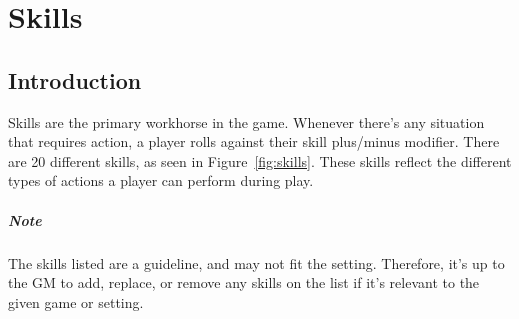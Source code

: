 \chapter{Skills} \label{chap:skills}
\section{Introduction}
Skills are the primary workhorse in the game. 
Whenever there's any situation that requires action, a player rolls against their skill plus/minus modifier. 
There are 20 different skills, as seen in Figure~\ref{fig:skills}. 
These skills reflect the different types of actions a player can perform during play.

\paragraph{Note} The skills listed are a guideline, and may not fit the setting. 
Therefore, it's up to the GM to add, replace, or remove any skills on the list if it's relevant to the given game or setting.





